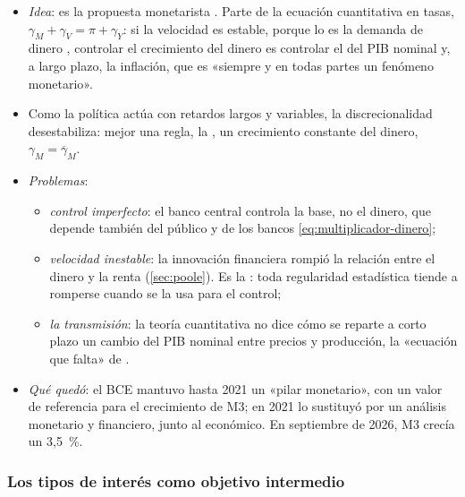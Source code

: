 \documentclass[11pt]{article}
\begin{document}
\begin{itemize}
\item \emph{Idea}: es la propuesta monetarista . Parte de la ecuación cuantitativa en tasas, $\gamma_M+\gamma_V=\pi+\gamma_Y$: si la velocidad es estable, porque lo es la demanda de dinero\nocite{Friedman1956Quantity} , controlar el crecimiento del dinero es controlar el del PIB nominal y, a largo plazo, la inflación, que es «siempre y en todas partes un fenómeno monetario»\nocite{Friedman1963Inflation}.
\item Como la política actúa con retardos largos y variables\nocite{Friedman1961Lag}, la discrecionalidad desestabiliza: mejor una regla, la , un crecimiento constante del dinero, $\gamma_M=\overline{\gamma}_M$\nocite{Friedman1960Program}.
\item \emph{Problemas}:
  \begin{itemize}
  \item \emph{control imperfecto}: el banco central controla la base, no el dinero, que depende también del público y de los bancos \eqref{eq:multiplicador-dinero};
  \item \emph{velocidad inestable}: la innovación financiera rompió la relación entre el dinero y la renta (\ref{sec:poole}). Es la : toda regularidad estadística tiende a romperse cuando se la usa para el control\nocite{Goodhart1975Problems};
  \item \emph{la transmisión}: la teoría cuantitativa no dice cómo se reparte a corto plazo un cambio del PIB nominal entre precios y producción, la «ecuación que falta» de \textcite{Friedman1970Theoretical}.
  \end{itemize}
\item \emph{Qué quedó}: el BCE mantuvo hasta 2021 un «pilar monetario», con un valor de referencia para el crecimiento de M3; en 2021 lo sustituyó por un análisis monetario y financiero, junto al económico\nocite{BCE2021Estrategia}. En septiembre de 2026, M3 crecía un 3,5~\%\nocite{BCE2026Agregados}.
\end{itemize}

\subsubsection{Los tipos de interés como objetivo intermedio}\label{sec:objetivo-tipos}
\end{document}
